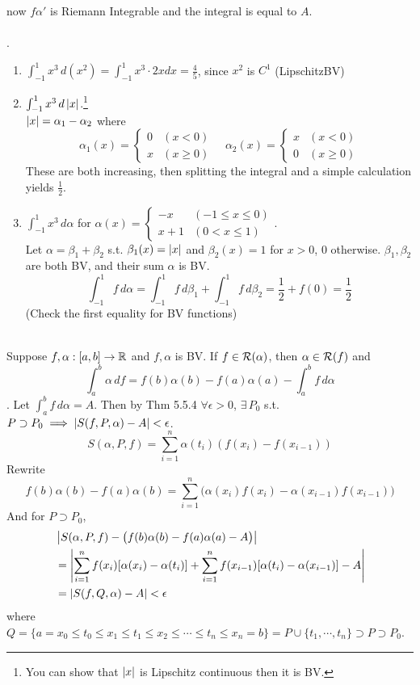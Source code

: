 now $f\alpha'$ is Riemann Integrable and the integral is equal to $A$.\\
\\
\ex.
\begin{enumerate}
	\item $\int_{-1}^1 x^3\,d(x^2) = \int_{-1}^1 x^3 \cdot 2xdx = \frac{4}{5}$, since $x^2$ is $C^1$ (\mimp Lipschitz\mimp BV)
	\item $\int_{-1}^1 x^3 \,d\left|x\right|$.\footnote{You can show that $\left|x\right|$ is Lipschitz continuous then it is BV.} \\
	$\left|x\right| = \alpha_1 - \alpha_2$ where
	$$\alpha_1(x) = \begin{cases}
		0 & (x < 0) \\ x & (x \geq 0)
	\end{cases} \quad \alpha_2(x) = \begin{cases}
		x & (x < 0) \\ 0 & (x\geq 0)
	\end{cases}$$
	These are both increasing, then splitting the integral and a simple calculation yields $\frac{1}{2}.$
	\item $\int_{-1}^1 x^3\,d\alpha$ for $\alpha(x) = \begin{cases}
		-x & (-1\leq x\leq 0) \\ x+1 & (0 < x\leq 1)
	\end{cases}$.\\
	Let $\alpha=\beta_1 + \beta_2$ s.t. $\beta_1(x) = \left|x\right|$ and $\beta_2(x) = 1$ for $x > 0$, 0 otherwise. $\beta_1, \beta_2$ are both BV, and their sum $\alpha$ is BV.\\
	$$\int_{-1}^1 f\,d\alpha = \int_{-1}^1 f\,d\beta_1 +  \int_{-1}^1 f\,d\beta_2 = \frac{1}{2} + f(0) = \frac{1}{2}$$
	(Check the first equality for BV functions)
\end{enumerate}~\\
 Suppose $f, \alpha:[a, b]\rightarrow \mathbb{R}$ and $f, \alpha$ is BV. If $f\in \mathcal{R}(\alpha)$, then $\alpha\in \mathcal{R}(f)$ and
$$\int_a^b \alpha\,df = f(b)\alpha(b) - f(a)\alpha(a) - \int_a^b f\,d\alpha$$
\pf. Let $\int_a^b f\,d\alpha = A$. Then by Thm 5.5.4 $\forall\epsilon > 0$, $\exists\,P_0$ s.t. $P\supset P_0 \implies \left|S(f, P, \alpha) - A\right| < \epsilon$.
$$S(\alpha, P, f) = \sum_{i=1}^n \alpha(t_i)(f(x_i) - f(x_{i-1}))$$
Rewrite $$f(b)\alpha(b) - f(a)\alpha(b) = \sum_{i=1}^n \big(\alpha(x_i)f(x_i) - \alpha(x_{i-1})f(x_{i-1})\big)$$
And for $P\supset P_0$,
$$\begin{aligned}
	&\left|S(\alpha, P, f) - \big( f(b)\alpha(b)-f(a)\alpha(a) - A \big)\right| \\
	&= \left|\sum_{i=1}^n f(x_i) [\alpha(x_i)-\alpha(t_i)] + \sum_{i=1}^n f(x_{i-1})[\alpha(t_i)-\alpha(x_{i-1})] - A\right|\\
	&= \left|S(f, Q, \alpha) - A\right| < \epsilon
\end{aligned}$$
where $Q = \{a=x_0 \leq t_0 \leq x_1 \leq t_1 \leq x_2 \leq \cdots \leq t_n \leq x_n = b \} = P\cup \{t_1,\cdots, t_n\} \supset P\supset P_0$.
\pagebreak
